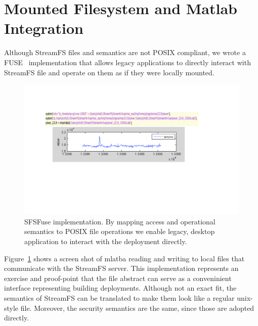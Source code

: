 \section{Mounted Filesystem and Matlab Integration}

Although StreamFS files and semantics are not POSIX compliant, we wrote a FUSE~\cite{fuse} implementation
that allows legacy applications to directly interact with StreamFS file and operate on them as if they were
locally mounted.

\begin{figure}[htb!]
\begin{center}
\includegraphics[scale=0.6]{figs/sfs_matlab}
\caption{SFSFuse implementation.  By mapping access and operational semantics to POSIX file operations
we enable legacy, desktop application to interact with the deployment directly.}
\label{fig:sfsfuse}
\end{center}
\end{figure}

Figure~\ref{fig:sfsfuse} shows a screen shot of mlatba reading and writing to local files that communicate 
with the StreamFS server.  This implementation represents an exercise and proof-point that the file abstract
can serve as a conveninient interface representing building deployments.  Although not an exact
fit, the semantics of StreamFS can be translated to make them look like a regular unix-style file.
Moreover, the security semantics are the same, since those are adopted directly.

